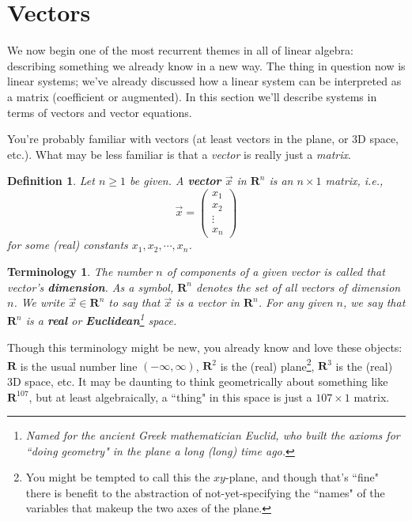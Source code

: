 \documentclass[12pt]{article}
\numberwithin{equation}{subsection}
\numberwithin{figure}{subsection}
\newtheorem{defn}[subsection]{Definition}
\theoremstyle{note}
\newtheorem{terminology}[subsection]{Terminology}
\begin{document}
\section{Vectors}
We now begin one of the most recurrent themes in all of linear algebra: describing something we already know in a new way. The thing in question now is linear systems; we've already discussed how a linear system can be interpreted as a matrix (coefficient or augmented). In this section we'll describe systems in terms of vectors and vector equations. 

You're probably familiar with vectors (at least vectors in the plane, or 3D space, etc.). What may be less familiar is that a \textit{vector} is really just a \textit{matrix}.

\begin{defn}\label{def-col-vec} Let $n\geq 1$ be given. A \textbf{vector} $\vec{x}$ in $\mathbf{R}^n$ is an $n\times 1$ matrix, i.e., \begin{equation} \vec{x}=\begin{pmatrix} x_1 \\ x_2 \\ \vdots \\ x_n\end{pmatrix} \end{equation} for some (real) constants $x_1, x_2, \cdots, x_n$. 
\end{defn}


\begin{terminology}The number $n$ of components of a given vector is called that vector's \textbf{dimension}. As a symbol, $\mathbf{R}^n$ denotes the set of all vectors of dimension $n$. We write $\vec{x}\in \mathbf{R}^n$ to say that $\vec{x}$ is a vector in $\mathbf{R}^n$. For any given $n$, we say that $\mathbf{R}^n$ is a \textbf{real} or \textbf{Euclidean}\footnote{Named for the ancient Greek mathematician Euclid, who built the axioms for ``doing geometry" in the plane a long (long) time ago.} space. 
\end{terminology} 

Though this terminology might be new, you already know and love these objects: $\mathbf{R}$ is the usual number line $(-\infty, \infty)$, $\mathbf{R}^2$ is the (real) plane\footnote{You might be tempted to call this the $xy$-plane, and though that's ``fine" there is benefit to the abstraction of not-yet-specifying the ``names" of the variables that makeup the two axes of the plane. }, $\mathbf{R}^3$ is the (real) 3D space, etc. It may be daunting to think geometrically about something like $\mathbf{R}^{107}$, but at least algebraically, a ``thing" in this space is just a $107 \times 1$ matrix.
\end{document}
